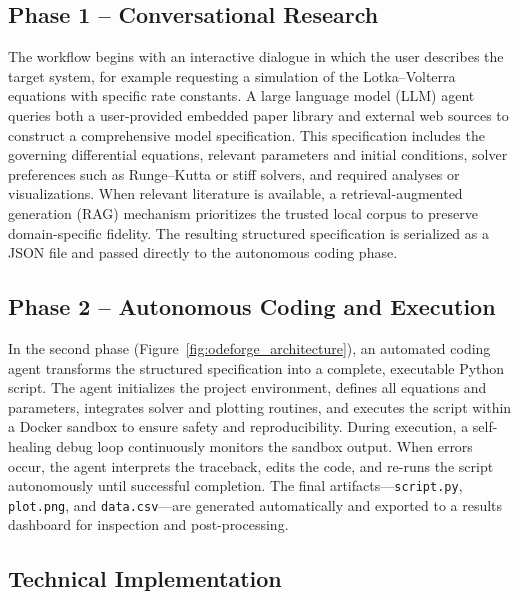 \subsection*{Phase 1 – Conversational Research}

The workflow begins with an interactive dialogue in which the user describes the target system, for example requesting a simulation of the Lotka–Volterra equations with specific rate constants. A large language model (LLM) agent queries both a user-provided embedded paper library and external web sources to construct a comprehensive model specification. This specification includes the governing differential equations, relevant parameters and initial conditions, solver preferences such as Runge–Kutta or stiff solvers, and required analyses or visualizations. When relevant literature is available, a retrieval-augmented generation (RAG) mechanism \cite{lewis2020retrieval} prioritizes the trusted local corpus to preserve domain-specific fidelity. The resulting structured specification is serialized as a JSON file and passed directly to the autonomous coding phase.

\subsection*{Phase 2 – Autonomous Coding and Execution}

In the second phase (Figure~\ref{fig:odeforge_architecture}), an automated coding agent transforms the structured specification into a complete, executable Python script. The agent initializes the project environment, defines all equations and parameters, integrates solver and plotting routines, and executes the script within a Docker sandbox to ensure safety and reproducibility. During execution, a self-healing debug loop continuously monitors the sandbox output. When errors occur, the agent interprets the traceback, edits the code, and re-runs the script autonomously until successful completion. The final artifacts—\texttt{script.py}, \texttt{plot.png}, and \texttt{data.csv}—are generated automatically and exported to a results dashboard for inspection and post-processing.


\subsection*{Technical Implementation}

